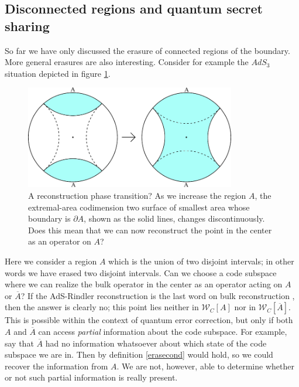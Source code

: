 \documentclass[11pt]{article}
\newcommand{\W}{\mathcal{W}}
\newcommand{\ol}{\overline}
\begin{document}
\subsection{Disconnected regions and quantum secret sharing}\label{discsec}
So far we have only discussed the erasure of connected regions of the boundary.  More general erasures are also interesting. Consider for example  the $AdS_3$ situation depicted in figure \ref{multiplefig}. 
\begin{figure}
\begin{center}
\includegraphics[height=4.5cm]{multiplefig.pdf}
\caption{A reconstruction phase transition?  As we increase the region $A$, the extremal-area codimension two surface of smallest area whose boundary is $\partial A$, shown as the solid lines, changes discontinuously.  Does this mean that we can now reconstruct the point in the center as an operator on $A$?}\label{multiplefig}
\end{center}
\end{figure}
Here we consider a region $A$ which is the union of two disjoint intervals; in other words we have erased two disjoint intervals.  Can we choose a code subspace where we can realize the bulk operator in the center as an operator acting on $A$ or $\ol{A}$?  If the AdS-Rindler reconstruction is the last word on bulk reconstruction \cite{Bousso:2012sj}, then the answer is clearly no; this point lies neither in $\W_C[A]$ nor in $\W_C[\ol{A}]$.  This is possible within the context of quantum error correction, but only if both $A$ and $\ol{A}$ can access \textit{partial} information about the code subspace.  For example, say that $\ol{A}$ had no information whatsoever about which state of the code subspace we are in.  Then by definition \eqref{erasecond} would hold, so we could recover the information from $A$.  We are not, however, able to determine whether or not such partial information is really present.
\end{document}
